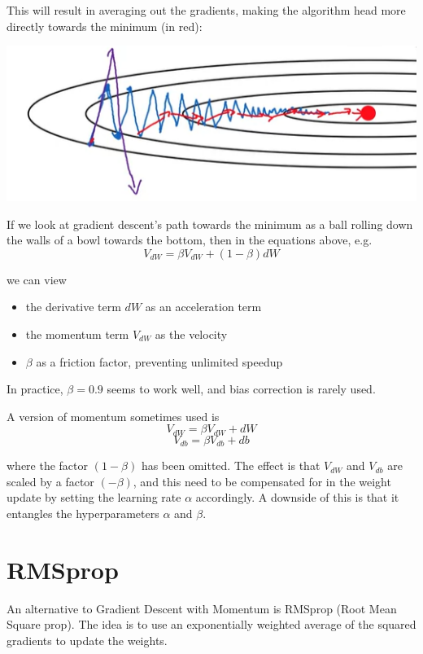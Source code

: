 This will result in averaging out the gradients, making the algorithm head more directly towards the minimum (in red):

\includegraphics*[width=0.7\linewidth]{images/gd_with_momentum.png}

If we look at gradient descent's path towards the minimum as a ball rolling down the walls of a bowl 
towards the bottom, then in the equations above, e.g.
\[ V_{dW} = \beta V_{dW} + (1 - \beta) dW \]

we can view

\begin{itemize}
	\item the derivative term $dW$ as an acceleration term
	\item the momentum term $V_{dW}$  as the velocity
	\item $\beta$ as a friction factor, preventing unlimited speedup
\end{itemize}
    
In practice, $\beta = 0.9$ seems to work well, and bias correction is rarely used.

A version of momentum sometimes used is
\[ V_{dW} = \beta V_{dW} + dW \]
\[ V_{db} = \beta V_{db} + db \]

where the factor $(1 - \beta)$  has been omitted. The effect is that $V_{dW}$  and $V_{db}$  are scaled 
by a factor $( - \beta)$, and this need to be compensated for in the weight update by setting 
the learning rate $\alpha$ accordingly. A downside of this is that it entangles the hyperparameters $\alpha$ and $\beta$.





\section{RMSprop}

An alternative to Gradient Descent with Momentum is RMSprop (Root Mean Square prop). The idea is to use an exponentially weighted 
average of the squared gradients to update the weights.

